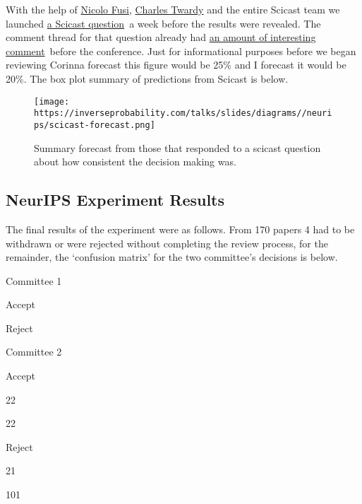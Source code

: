 \documentclass[a4paperpaper,]{article}
\begin{document}
With the help of \href{http://nicolofusi.com/}{Nicolo Fusi},
\href{http://blog.scicast.org/tag/charles-twardy/}{Charles Twardy} and
the entire Scicast team we launched
\href{https://scicast.org/\#!/questions/1083/trades/create/power}{a
Scicast question}~a week before the results were revealed. The comment
thread for that question already had
\href{https://scicast.org/\#!/questions/1083/comments/power}{an amount
of interesting comment}~before the conference. Just for informational
purposes before we began reviewing Corinna forecast this figure would be
25\% and I forecast it would be 20\%. The box plot summary of
predictions from Scicast is below.

\begin{figure}[htb]
\begin{center}
\texttt{[image: https://inverseprobability.com/talks/slides/diagrams//neurips/scicast-forecast.png]}
\end{center}


\caption{Summary forecast from those that responded to a scicast question about how consistent the decision making was.}
\label{scicast-forecast}
\end{figure}

\hypertarget{neurips-experiment-results}{%
\subsection{NeurIPS Experiment
Results}\label{neurips-experiment-results}}

\begin{flushright}
\end{flushright}

The final results of the experiment were as follows. From 170 papers 4
had to be withdrawn or were rejected without completing the review
process, for the remainder, the `confusion matrix' for the two
committee's decisions is below.

Committee 1

Accept

Reject

Committee 2

Accept

22

22

Reject

21

101
\end{document}
